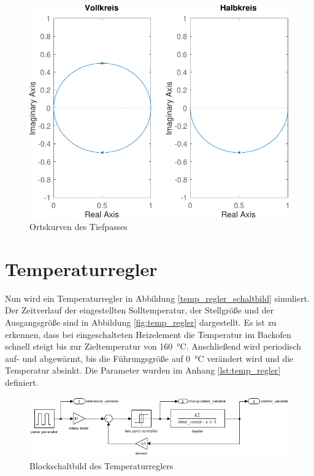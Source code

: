 \documentclass[
    paper=a4,
    fontsize=10pt,
    DIV=13,
    oneside,
]{scrartcl}
\begin{document}
    \begin{figure}
        \centering
        \includegraphics[width=\imagewidth]{../versuch1/ortskurve}
        \caption{Ortskurven des Tiefpasses}
        \label{fig:ortskurve}
    \end{figure}

\section{Temperaturregler}
    Nun wird ein Temperaturregler in Abbildung \ref{temp_regler_schaltbild} simuliert. Der Zeitverlauf der eingestellten Solltemperatur, der Stellgröße und der Ausgangsgröße sind in Abbildung \ref{fig:temp_regler} dargestellt. Es ist zu erkennen, dass bei eingeschalteten Heizelement die Temperatur im Backofen schnell steigt bis zur Zieltemperatur von \SI{160}{\celsius}. Anschließend wird periodisch auf- und abgewärmt, bis die Führungsgröße auf \SI{0}{\celsius} verändert wird und die Temperatur absinkt. Die Parameter wurden im Anhang \ref{lst:temp_regler} definiert.

    \begin{figure}
        \centering
        \includegraphics[width=\imagewidth]{../versuch1/tempregler_block.png}
        \caption{Blockschaltbild des Temperaturreglers}
        \label{fig:temp_regler_schaltbild}
    \end{figure}    
\end{document}
